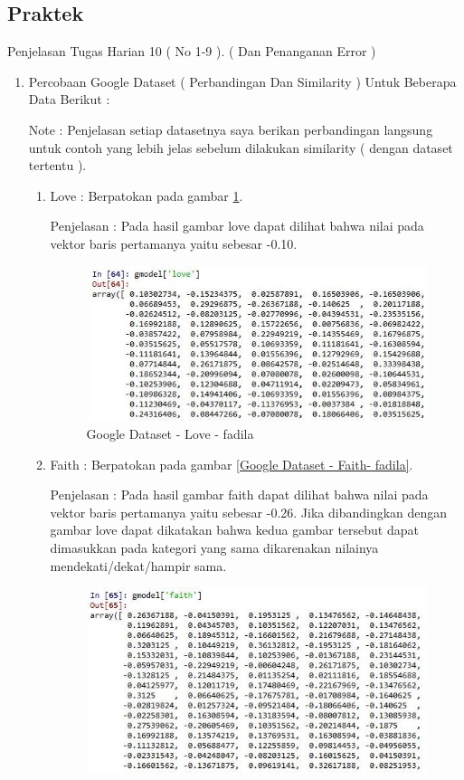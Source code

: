 \subsection{Praktek}
Penjelasan Tugas Harian 10 ( No 1-9 ). ( Dan Penanganan Error )
\begin{enumerate}
\item Percobaan Google Dataset ( Perbandingan Dan Similarity ) Untuk Beberapa Data Berikut :
\par Note : Penjelasan setiap datasetnya saya berikan perbandingan langsung untuk contoh yang lebih jelas sebelum dilakukan similarity ( dengan dataset tertentu ).
\begin{enumerate}
\item Love : Berpatokan pada gambar \ref{Google Dataset - Love - fadila}.
\par Penjelasan : Pada hasil gambar love dapat dilihat bahwa nilai pada vektor baris pertamanya yaitu sebesar -0.10.
\par
\begin{figure}[!hbtp]
\centering
\includegraphics[scale=0.3]{figures/1-love-fadila.jpg}
\caption{Google Dataset - Love - fadila}
\label{Google Dataset - Love - fadila}
\end{figure}
\par
\item Faith :  Berpatokan pada gambar \ref{Google Dataset - Faith- fadila}.
\par Penjelasan : Pada hasil gambar faith dapat dilihat bahwa nilai pada vektor baris pertamanya yaitu sebesar -0.26. Jika dibandingkan dengan gambar love dapat dikatakan bahwa kedua gambar tersebut dapat dimasukkan pada kategori yang sama dikarenakan nilainya mendekati/dekat/hampir sama.
\par
\begin{figure}[!hbtp]
\centering
\includegraphics[scale=0.3]{figures/1-faith-fadila.jpg}

\end{figure}
\end{enumerate}
\end{enumerate}
